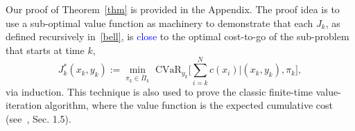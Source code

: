 \documentclass[letterpaper, 10 pt, conference]{ieeeconf}  %
\begin{document}
Our proof of Theorem~\ref{thm} is provided in the Appendix.
The proof idea is to use a sub-optimal value function as machinery to demonstrate that each $J_k$, as defined recursively in~\eqref{bell},
is \textcolor{blue}{close} to the optimal cost-to-go of the sub-problem that starts at time $k$,
\begin{equation}
J_k^*(x_k, y_k) := {\underset{\pi_k \in \bar{\Pi}_k}\min} \text{ CVaR}_{y_k} \big[ \textstyle\sum_{i=k}^N c(x_i) \big| (x_k, y_k), \pi_k \big],
\label{Jkstar}\end{equation}
via induction. This technique is also used to prove the classic finite-time value-iteration algorithm, 
where the value function is the expected cumulative cost (see~\cite{bertsekas2005dynamic}, Sec. 1.5).
%
%
\end{document}
